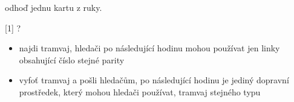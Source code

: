 \begin{cards}
	\cost odhoď jednu kartu z ruky.

	 ?
	\begin{itemize}
		\item najdi tramvaj, hledači po následující hodinu mohou používat jen linky obsahující číslo stejné parity
		\item vyfoť tramvaj a pošli hledačům, po následující hodinu je jediný dopravní prostředek, který mohou hledači používat, tramvaj stejného typu
	\end{itemize}
\end{cards}
